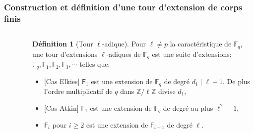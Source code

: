 \documentclass[10pt,a4paper]{beamer}
\theoremstyle{plain}
\theoremstyle{definition}
\theoremstyle{definition}
\theoremstyle{definition}
\theoremstyle{definition}
\newtheorem{defi}[thm]{Définition}
\theoremstyle{remark}
\theoremstyle{remark}
\theoremstyle{definition}
\begin{document}
\begin{frame}
\frametitle{Construction et définition d'une tour d'extension de corps finis}
\begin{columns}
\begin{column}{2cm}
\begin{center}
\begin{figure}
\end{figure}
\end{center}
\end{column}
\begin{column}{8cm}

\begin{defi}[Tour \textit{$\ell$}-adique]
Pour $\ell \neq p$ la caractéristique de $\mathbb{F}_q$, une tour d'extensions 
$\ell$-adiques de $\mathbb{F}_q$ est une suite d'extensions: $\mathbb{F}_q, 
\mathsf{F}_{1}, \mathsf{F}_{2}, \mathsf{F}_{3}, \cdots$ telles que:
\begin{itemize}
\item{} [Cas Elkies] $\mathsf{F}_{1}$ est une extension de $\mathbb{F}_q$ de 
degré $d_1 \mid \ell-1$. De plus l'ordre multiplicatif de $q$ dans 
$\mathbb{Z}/\ell \mathbb{Z}$ divise $d_1$,
\item{} [Cas Atkin] $\mathsf{F}_{1}$ est une extension de $\mathbb{F}_q$ de 
degré au plus $ \ell^2-1$,
\item $\mathsf{F}_{i}$ pour $i \geqslant 2$ est une extension de 
$\mathsf{F}_{i-1}$ de degré $\ell$.
\end{itemize}

\end{defi}
\end{column}
\end{columns}
\end{frame}

\end{document}
